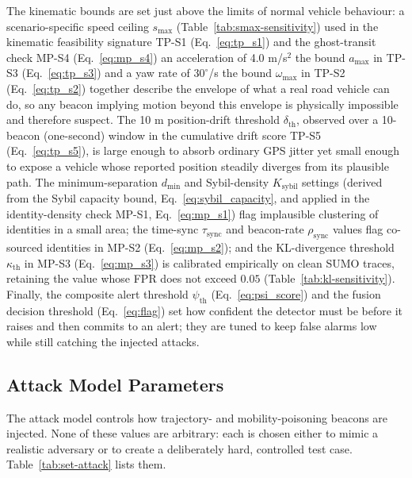 \documentclass[12pt, a4paper]{report}
\begin{document}
The kinematic bounds are set just above the limits of normal vehicle behaviour:
a scenario-specific speed ceiling $s_{\max}$ (Table~\ref{tab:smax-sensitivity})
used in the kinematic feasibility signature TP-S1 (Eq.~\ref{eq:tp_s1}) and
the ghost-transit check MP-S4 (Eq.~\ref{eq:mp_s4})  an acceleration of 4.0 m/s$^2$ the bound
$a_{\max}$ in TP-S3 (Eq.~\ref{eq:tp_s3})  and a yaw rate of $30^\circ$/s
the bound $\omega_{\max}$ in TP-S2 (Eq.~\ref{eq:tp_s2}) together describe
the envelope of what a real road vehicle can do, so any beacon implying motion
beyond this envelope is physically impossible and therefore suspect. The 10 m
position-drift threshold $\delta_{\mathrm{th}}$, observed over a 10-beacon
(one-second) window in the cumulative drift score TP-S5 (Eq.~\ref{eq:tp_s5}),
is large enough to absorb ordinary GPS jitter yet small enough to expose a
vehicle whose reported position steadily diverges from its plausible path. The
minimum-separation $d_{\min}$ and Sybil-density $K_{\mathrm{sybil}}$ settings
(derived from the Sybil capacity bound, Eq.~\ref{eq:sybil_capacity}, and applied
in the identity-density check MP-S1, Eq.~\ref{eq:mp_s1}) flag implausible
clustering of identities in a small area; the time-sync $\tau_{\mathrm{sync}}$
and beacon-rate $\rho_{\mathrm{sync}}$ values flag co-sourced identities in
MP-S2 (Eq.~\ref{eq:mp_s2}); and the KL-divergence threshold $\kappa_{\mathrm{th}}$ in MP-S3
(Eq.~\ref{eq:mp_s3}) is calibrated empirically on clean SUMO traces,
retaining the value whose FPR does not exceed $0.05$
(Table~\ref{tab:kl-sensitivity}). Finally, the composite alert threshold $\psi_{\mathrm{th}}$
(Eq.~\ref{eq:psi_score}) and the fusion decision threshold (Eq.~\ref{eq:flag})
set how confident the detector must be before it raises and then commits to an
alert; they are tuned to keep false alarms low while still catching the injected
attacks.

\subsection{Attack Model Parameters}

The attack model controls how trajectory- and mobility-poisoning beacons are
injected. None of these values are arbitrary: each is chosen either to mimic a
realistic adversary or to create a deliberately hard, controlled test case.
Table~\ref{tab:set-attack} lists them.
\end{document}
